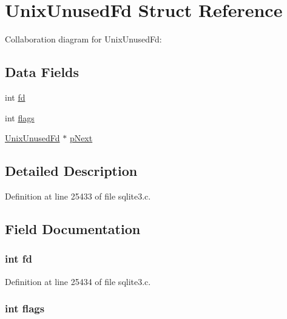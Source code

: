 \hypertarget{struct_unix_unused_fd}{}\section{Unix\+Unused\+Fd Struct Reference}
\label{struct_unix_unused_fd}


Collaboration diagram for Unix\+Unused\+Fd\+:
\subsection*{Data Fields}
\begin{DoxyCompactItemize}
\item 
int \hyperlink{struct_unix_unused_fd_a6f8059414f0228f0256115e024eeed4b}{fd}
\item 
int \hyperlink{struct_unix_unused_fd_ac8bf36fe0577cba66bccda3a6f7e80a4}{flags}
\item 
\hyperlink{struct_unix_unused_fd}{Unix\+Unused\+Fd} $\ast$ \hyperlink{struct_unix_unused_fd_ade35b43b2b510ea525faaa27fcc29cc0}{p\+Next}
\end{DoxyCompactItemize}


\subsection{Detailed Description}


Definition at line 25433 of file sqlite3.\+c.



\subsection{Field Documentation}
\hypertarget{struct_unix_unused_fd_a6f8059414f0228f0256115e024eeed4b}{}
\subsubsection[{fd}]{\setlength{\rightskip}{0pt plus 5cm}int fd}\label{struct_unix_unused_fd_a6f8059414f0228f0256115e024eeed4b}


Definition at line 25434 of file sqlite3.\+c.

\hypertarget{struct_unix_unused_fd_ac8bf36fe0577cba66bccda3a6f7e80a4}{}
\subsubsection[{flags}]{\setlength{\rightskip}{0pt plus 5cm}int flags}\label{struct_unix_unused_fd_ac8bf36fe0577cba66bccda3a6f7e80a4}


